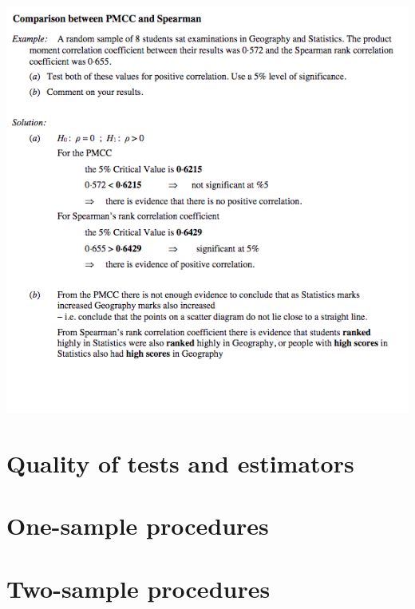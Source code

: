\documentclass[a4paper]{article}
\begin{document}
\begin{center}
	\includegraphics[scale=0.5]{img_S/20_eg4}
\end{center}


\section{Quality of tests and estimators}

\section{One-sample procedures}

\section{Two-sample procedures}

\printindex
\end{document}

